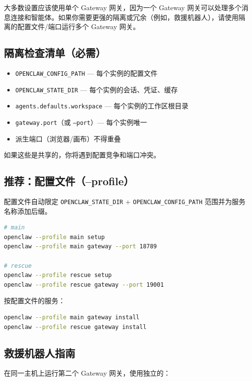 大多数设置应该使用单个 Gateway 网关，因为一个 Gateway 网关可以处理多个消息连接和智能体。如果你需要更强的隔离或冗余（例如，救援机器人），请使用隔离的配置文件/端口运行多个 Gateway 网关。

\subsection{隔离检查清单（必需）}


\begin{itemize}
  \item \texttt{OPENCLAW\_CONFIG\_PATH} — 每个实例的配置文件
  \item \texttt{OPENCLAW\_STATE\_DIR} — 每个实例的会话、凭证、缓存
  \item \texttt{agents.defaults.workspace} — 每个实例的工作区根目录
  \item \texttt{gateway.port}（或 \texttt{--port}）— 每个实例唯一
  \item 派生端口（浏览器/画布）不得重叠
\end{itemize}


如果这些是共享的，你将遇到配置竞争和端口冲突。

\subsection{推荐：配置文件（--profile）}


配置文件自动限定 \texttt{OPENCLAW\_STATE\_DIR} + \texttt{OPENCLAW\_CONFIG\_PATH} 范围并为服务名称添加后缀。

\begin{lstlisting}[language=bash]
# main
openclaw --profile main setup
openclaw --profile main gateway --port 18789

# rescue
openclaw --profile rescue setup
openclaw --profile rescue gateway --port 19001
\end{lstlisting}


按配置文件的服务：

\begin{lstlisting}[language=bash]
openclaw --profile main gateway install
openclaw --profile rescue gateway install
\end{lstlisting}


\subsection{救援机器人指南}


在同一主机上运行第二个 Gateway 网关，使用独立的：

